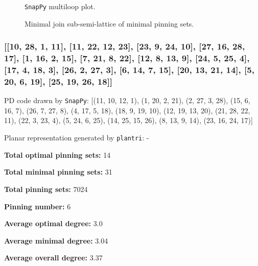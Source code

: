 \documentclass{article}%
\begin{document}
\begin{multicols}{2}
\begin{figure}[H]
\centering

\caption{\texttt{SnapPy} multiloop plot.}
\label{fig:tex/img/[[20, 28, 1, 21], [21, 13, 22, 14], [14, 19, 15, 20], [15, 27, 16, 28], [1, 16, 2, 17], [17, 12, 18, 13], [22, 18, 23, 19], [26, 8, 27, 9], [2, 8, 3, 7], [11, 6, 12, 7], [23, 6, 24, 5], [9, 5, 10, 4],.svg}
\end{figure}
\columnbreak

\begin{figure}[H]
\centering
\scalebox{0.8}{}
\caption{Minimal join sub-semi-lattice of minimal pinning sets.}
\label{fig:tex/img/[[20, 28, 1, 21], [21, 13, 22, 14], [14, 19, 15, 20], [15, 27, 16, 28], [1, 16, 2, 17], [17, 12, 18, 13], [22, 18, 23, 19], [26, 8, 27, 9], [2, 8, 3, 7], [11, 6, 12, 7], [23, 6, 24, 5], [9, 5, 10, 4],.pgf}
\end{figure}
\end{multicols}

\newpage

\subsubsection{[[10, 28, 1, 11], [11, 22, 12, 23], [23, 9, 24, 10], [27, 16, 28, 17], [1, 16, 2, 15], [7, 21, 8, 22], [12, 8, 13, 9], [24, 5, 25, 4], [17, 4, 18, 3], [26, 2, 27, 3], [6, 14, 7, 15], [20, 13, 21, 14], [5, 20, 6, 19], [25, 19, 26, 18]]}

{\small\noindent PD code drawn by \texttt{SnapPy}: [(11, 10, 12, 1), (1, 20, 2, 21), (2, 27, 3, 28), (15, 6, 16, 7), (26, 7, 27, 8), (4, 17, 5, 18), (18, 9, 19, 10), (12, 19, 13, 20), (21, 28, 22, 11), (22, 3, 23, 4), (5, 24, 6, 25), (14, 25, 15, 26), (8, 13, 9, 14), (23, 16, 24, 17)]}

{\small\noindent Planar representation generated by \texttt{plantri}: -}

\begin{multicols}{2}
{\normalsize \noindent\textbf{Total optimal pinning sets:} 14

\noindent\textbf{Total minimal pinning sets:} 31

\noindent\textbf{Total pinning sets:} 7024

\noindent\textbf{Pinning number:} 6

}
\columnbreak

{\normalsize \noindent\textbf{Average optimal degree:} 3.0

\noindent\textbf{Average minimal degree:} 3.04

\noindent\textbf{Average overall degree:} 3.37

}
\end{multicols}
\end{document}
